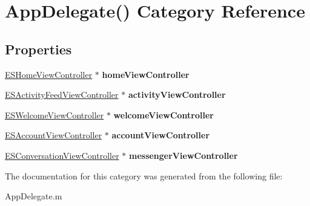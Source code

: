 \hypertarget{category_app_delegate_07_08}{}\section{App\+Delegate() Category Reference}
\label{category_app_delegate_07_08}
\subsection*{Properties}
\begin{DoxyCompactItemize}
\item 
\hypertarget{category_app_delegate_07_08_af1558d1ffcd7ea02ccfa9ec3632ad9de}{}\hyperlink{interface_e_s_home_view_controller}{E\+S\+Home\+View\+Controller} $\ast$ {\bfseries home\+View\+Controller}\label{category_app_delegate_07_08_af1558d1ffcd7ea02ccfa9ec3632ad9de}

\item 
\hypertarget{category_app_delegate_07_08_ac0508ef256205ee7e5c6f0bda62ba938}{}\hyperlink{interface_e_s_activity_feed_view_controller}{E\+S\+Activity\+Feed\+View\+Controller} $\ast$ {\bfseries activity\+View\+Controller}\label{category_app_delegate_07_08_ac0508ef256205ee7e5c6f0bda62ba938}

\item 
\hypertarget{category_app_delegate_07_08_af1899c697b46a608cf809ecbc1b7492c}{}\hyperlink{interface_e_s_welcome_view_controller}{E\+S\+Welcome\+View\+Controller} $\ast$ {\bfseries welcome\+View\+Controller}\label{category_app_delegate_07_08_af1899c697b46a608cf809ecbc1b7492c}

\item 
\hypertarget{category_app_delegate_07_08_a3464c0ceaa999bb600e714b8e32cccff}{}\hyperlink{interface_e_s_account_view_controller}{E\+S\+Account\+View\+Controller} $\ast$ {\bfseries account\+View\+Controller}\label{category_app_delegate_07_08_a3464c0ceaa999bb600e714b8e32cccff}

\item 
\hypertarget{category_app_delegate_07_08_a03b295cd5aaf472c723bac3559a9f079}{}\hyperlink{interface_e_s_conversation_view_controller}{E\+S\+Conversation\+View\+Controller} $\ast$ {\bfseries messenger\+View\+Controller}\label{category_app_delegate_07_08_a03b295cd5aaf472c723bac3559a9f079}

\end{DoxyCompactItemize}


The documentation for this category was generated from the following file\+:\begin{DoxyCompactItemize}
\item 
App\+Delegate.\+m\end{DoxyCompactItemize}
